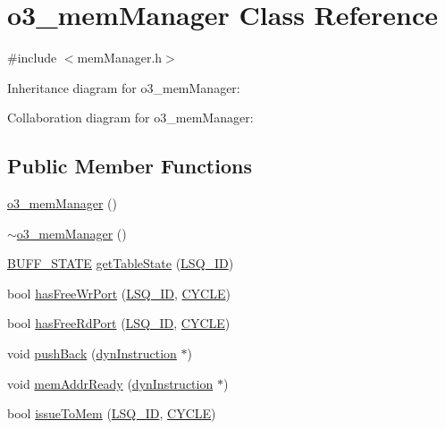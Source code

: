 \hypertarget{classo3__memManager}{
\section{o3\_\-memManager Class Reference}
\label{classo3__memManager}
}


{\ttfamily \#include $<$memManager.h$>$}



Inheritance diagram for o3\_\-memManager:


Collaboration diagram for o3\_\-memManager:
\subsection*{Public Member Functions}
\begin{DoxyCompactItemize}
\item 
\hyperlink{classo3__memManager_ac2f65f772f531fa8c4a01fe6ef344bdf}{o3\_\-memManager} ()
\item 
\hyperlink{classo3__memManager_a2e67f82384e5ee8a753332a347eac62f}{$\sim$o3\_\-memManager} ()
\item 
\hyperlink{global_2global_8h_a8bd4ea2582a6025c1cfe99bf9947489c}{BUFF\_\-STATE} \hyperlink{classo3__memManager_a19302a13552a70cda08814dcfc0daa30}{getTableState} (\hyperlink{o3_2lsq_8h_a3bb5a7f1114a20672e012bf0dfe5fb24}{LSQ\_\-ID})
\item 
bool \hyperlink{classo3__memManager_af32030ab25dd729e0aa65a15e60ad562}{hasFreeWrPort} (\hyperlink{o3_2lsq_8h_a3bb5a7f1114a20672e012bf0dfe5fb24}{LSQ\_\-ID}, \hyperlink{global_2global_8h_a7e19a550ec11d1ed921deb20c22efb5b}{CYCLE})
\item 
bool \hyperlink{classo3__memManager_a71127b3f6545996a55cfa87735cb433f}{hasFreeRdPort} (\hyperlink{o3_2lsq_8h_a3bb5a7f1114a20672e012bf0dfe5fb24}{LSQ\_\-ID}, \hyperlink{global_2global_8h_a7e19a550ec11d1ed921deb20c22efb5b}{CYCLE})
\item 
void \hyperlink{classo3__memManager_a7bfed5553c2212750ee610da67bc43e7}{pushBack} (\hyperlink{classdynInstruction}{dynInstruction} $\ast$)
\item 
void \hyperlink{classo3__memManager_a401c114902989a9296444795c28cd5fb}{memAddrReady} (\hyperlink{classdynInstruction}{dynInstruction} $\ast$)
\item 
bool \hyperlink{classo3__memManager_a9e44a6173a6b099fa6e7644960aac5cf}{issueToMem} (\hyperlink{o3_2lsq_8h_a3bb5a7f1114a20672e012bf0dfe5fb24}{LSQ\_\-ID}, \hyperlink{global_2global_8h_a7e19a550ec11d1ed921deb20c22efb5b}{CYCLE})

\end{DoxyCompactItemize}
